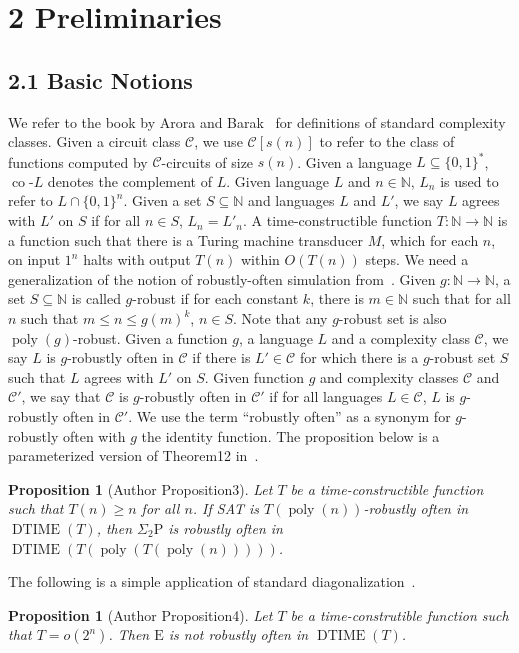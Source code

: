 \documentclass[10pt,a4paper]{article}
\newtheorem{ntproposition}[nttheorem]{Proposition}
\newcommand{\DTIME}{\operatorname{DTIME}}
\newcommand{\poly}{\operatorname{poly}}
\begin{document}
\section*{2 Preliminaries}
\subsection*{2.1 Basic Notions}
We refer to the book by Arora and Barak~\cite{ref9} for definitions of standard complexity classes.
Given a circuit class $\mathcal C$, we use $\mathcal C[s(n)]$ to refer to the class of functions computed by $\mathcal C$-circuits of size $s(n)$.
Given a language $L\subseteq\{0,1\}^*$, $\operatorname{co}\text{-}L$ denotes the complement of $L$. Given language $L$ and $n\in\mathbb N$, $L_n$ is used to refer to $L\cap\{0,1\}^n$.
Given a set $S\subseteq\mathbb N$ and languages $L$ and $L'$, we say $L$ agrees with $L'$ on $S$ if for all $n\in S$, $L_n=L'_n$.
A time-constructible function $T:\mathbb N\to\mathbb N$ is a function such that there is a Turing machine transducer $M$, which for each $n$, on input $1^n$ halts with output $T(n)$ within $O(T(n))$ steps.
We need a generalization of the notion of robustly-often simulation from~\cite{ref11}. Given $g:\mathbb N\to\mathbb N$, a set $S\subseteq\mathbb N$ is called $g$-robust if for each constant $k$, there is $m\in\mathbb N$ such that for all $n$ such that $m\leq n\leq g(m)^k$, $n\in S$. Note that any $g$-robust set is also $\poly(g)$-robust.
Given a function $g$, a language $L$ and a complexity class $\mathcal C$, we say $L$ is $g$-robustly often in $\mathcal C$ if there is $L'\in\mathcal C$ for which there is a $g$-robust set $S$ such that $L$ agrees with $L'$ on $S$. Given function $g$ and complexity classes $\mathcal C$ and $\mathcal C'$, we say that $\mathcal C$ is $g$-robustly often in $\mathcal C'$ if for all languages $L\in\mathcal C$, $L$ is $g$-robustly often in $\mathcal C'$. We use the term ``robustly often'' as a synonym for $g$-robustly often with $g$ the identity function.
The proposition below is a parameterized version of Theorem12 in~\cite{ref11}.
\setcounter{nttheorem}{2}
\begin{ntproposition}[Author Proposition3]
Let $T$ be a time-constructible function such that $T(n)\geq n$ for all $n$. If SAT is $T(\poly(n))$-robustly often in $\DTIME(T)$, then $\Sigma_2\mathrm P$ is robustly often in $\DTIME(T(\poly(T(\poly(n)))))$.
\end{ntproposition}
The following is a simple application of standard diagonalization~\cite{ref13}.
\begin{ntproposition}[Author Proposition4]
Let $T$ be a time-construtible function such that $T=o(2^n)$. Then $\mathrm E$ is not robustly often in $\DTIME(T)$.
\end{ntproposition}
\end{document}

